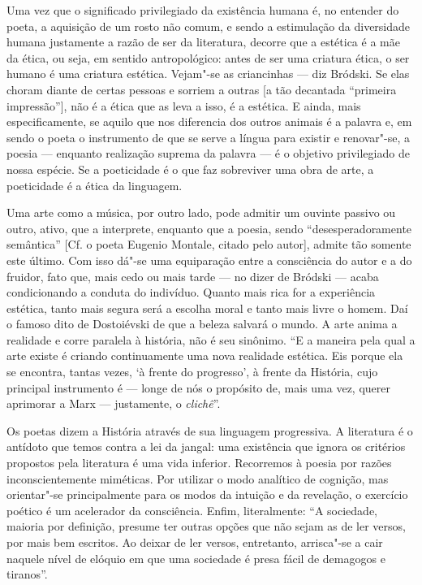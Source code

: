 {Uma vez que o significado privilegiado da existência humana é, no
entender do poeta, a aquisição de um rosto não comum, e sendo a
estimulação da diversidade humana justamente a razão de ser da
literatura, decorre que a estética é a mãe da ética, ou seja, em sentido
antropológico: antes de ser uma criatura ética, o ser humano é uma
criatura estética. Vejam"-se as criancinhas --- diz Bródski. Se elas
choram diante de certas pessoas e sorriem a outras {[}a tão decantada
``primeira impressão''{]}, não é a ética que as leva a isso, é a
estética. E ainda, mais especificamente, se aquilo que nos diferencia
dos outros animais é a palavra e, em sendo o poeta o instrumento de que se
serve a língua para existir e renovar"-se, a poesia --- enquanto
realização suprema da palavra --- é o objetivo privilegiado de nossa
espécie. Se a poeticidade é o que faz sobreviver uma obra de arte, a
poeticidade é a ética da linguagem.

Uma arte como a música, por outro lado, pode admitir um ouvinte passivo
ou outro, ativo, que a interprete, enquanto que a poesia, sendo
``desesperadoramente semântica'' {[}Cf. o poeta Eugenio Montale, citado
pelo autor{]}, admite tão somente este último. Com isso dá"-se uma
equiparação entre a consciência do autor e a do fruidor, fato que, mais
cedo ou mais tarde --- no dizer de Bródski --- acaba condicionando a
conduta do indivíduo. Quanto mais rica for a experiência estética, tanto
mais segura será a escolha moral e tanto mais livre o homem. Daí o
famoso dito de Dostoiévski de que a beleza salvará o mundo. A arte anima
a realidade e corre paralela à história, não é seu sinônimo. ``E a
maneira pela qual a arte existe é criando continuamente uma nova
realidade estética. Eis porque ela se encontra, tantas vezes, `à frente
do progresso', à frente da História, cujo principal instrumento é ---
longe de nós o propósito de, mais uma vez, querer aprimorar a Marx ---
justamente, o \emph{clichê}''.

Os poetas dizem a História através de sua linguagem progressiva. A
literatura é o antídoto que temos contra a lei da jangal: uma existência
que ignora os critérios propostos pela literatura é uma vida inferior.
Recorremos à poesia por razões inconscientemente miméticas. Por utilizar
o modo analítico de cognição, mas orientar"-se principalmente para os
modos da intuição e da revelação, o exercício poético é um acelerador da
consciência. Enfim, literalmente: ``A sociedade, maioria por definição,
presume ter outras opções que não sejam as de ler versos, por mais bem
escritos. Ao deixar de ler versos, entretanto, arrisca"-se a cair naquele
nível de elóquio em que uma sociedade é presa fácil de demagogos e
tiranos''.

}
